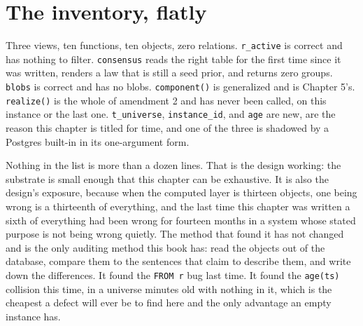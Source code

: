 \section{The inventory, flatly}

Three views, ten functions, ten objects, zero relations. \texttt{r\_active} is correct and has nothing to filter. \texttt{consensus} reads the right table for the first time since it was written, renders a law that is still a seed prior, and returns zero groups. \texttt{blobs} is correct and has no blobs. \texttt{component()} is generalized and is Chapter 5's. \texttt{realize()} is the whole of amendment 2 and has never been called, on this instance or the last one. \texttt{t\_universe}, \texttt{instance\_id}, and \texttt{age} are new, are the reason this chapter is titled for time, and one of the three is shadowed by a Postgres built-in in its one-argument form.

Nothing in the list is more than a dozen lines. That is the design working: the substrate is small enough that this chapter can be exhaustive. It is also the design's exposure, because when the computed layer is thirteen objects, one being wrong is a thirteenth of everything, and the last time this chapter was written a sixth of everything had been wrong for fourteen months in a system whose stated purpose is not being wrong quietly. The method that found it has not changed and is the only auditing method this book has: read the objects out of the database, compare them to the sentences that claim to describe them, and write down the differences. It found the \texttt{FROM r} bug last time. It found the \texttt{age(ts)} collision this time, in a universe minutes old with nothing in it, which is the cheapest a defect will ever be to find here and the only advantage an empty instance has.
